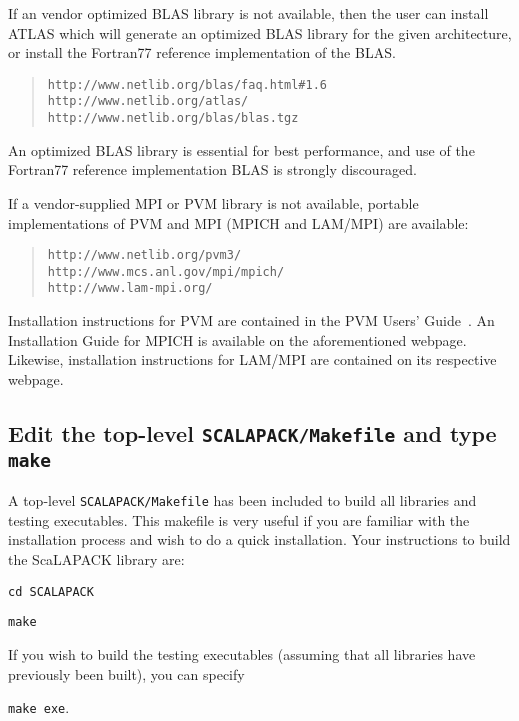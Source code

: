 \documentclass[11pt]{report}
\begin{document}
If an vendor optimized BLAS library is not available, then the user can
install ATLAS which will generate an optimized BLAS library for the given
architecture, or install the Fortran77 reference implementation of the BLAS.
\begin{quote}
{\tt http://www.netlib.org/blas/faq.html\#1.6} \\
{\tt http://www.netlib.org/atlas/} \\
{\tt http://www.netlib.org/blas/blas.tgz}
\end{quote}
An optimized BLAS library is essential for best performance, and
use of the Fortran77 reference implementation BLAS is strongly
discouraged.

If a vendor-supplied MPI or PVM library is not available,
portable implementations of PVM and MPI (MPICH and LAM/MPI)
are available:
\begin{quote}
{\tt http://www.netlib.org/pvm3/}\\
{\tt http://www.mcs.anl.gov/mpi/mpich/} \\
{\tt http://www.lam-mpi.org/}
\end{quote}
Installation instructions for PVM are contained in the PVM Users'
Guide~\cite{pvm}.  An Installation Guide for MPICH is available on
the aforementioned webpage.  Likewise, installation instructions
for LAM/MPI are contained on its respective webpage.

\subsection{Edit the top-level {\tt SCALAPACK/Makefile} and type {\tt make}}

A top-level {\tt SCALAPACK/Makefile} has been included to build all
libraries and testing executables.  This makefile is very useful if you
are familiar with the installation process and wish to do a quick
installation.  Your instructions to build the ScaLAPACK library are:

\begin{list}{}{}
\item {\tt cd SCALAPACK}
\item {\tt make}
\end{list}

If you wish to build the testing executables (assuming that all
libraries have previously been built), you can specify

\begin{list}{}{}
\item {\tt make exe}.
\end{list}
\end{document}
